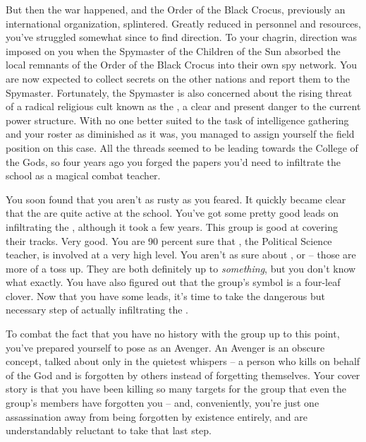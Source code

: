 \documentclass[char]{GL2020}
\begin{document}
But then the war happened, and the Order of the Black Crocus, previously an international organization, splintered. Greatly reduced in personnel and resources, you've struggled somewhat since to find direction. To your chagrin, direction was imposed on you when the Spymaster of the Children of the Sun absorbed the local remnants of the Order of the Black Crocus into their own spy network. You are now expected to collect secrets on the other nations and report them to the Spymaster. Fortunately, the Spymaster is also concerned about the rising threat of a radical religious cult known as the \pGoaties{}, a clear and present danger to the current power structure. With no one better suited to the task of intelligence gathering and your roster as diminished as it was, you managed to assign yourself the field position on this case. All the threads seemed to be leading towards the College of the Gods, so four years ago you forged the papers you'd need to infiltrate the school as a magical combat teacher.

You soon found that you aren't as rusty as you feared. It quickly became clear that the \pGoaties{} are quite active at the school. You've got some pretty good leads on infiltrating the \pGoaties{}, although it took a few years. This group is good at covering their tracks. Very good. You are 90 percent sure that \cChupInventor{\full}, the Political Science teacher, is involved at a very high level. You aren't as sure about \cChupSecond{\full}, or \cWildCard{\full} -- those are more of a toss up. They are both definitely up to \emph{something}, but you don't know what exactly. You have also figured out that the group's symbol is a four-leaf clover. Now that you have some leads, it's time to take the dangerous but necessary step of actually infiltrating the \pGoaties{}.

To combat the fact that you have no history with the group up to this point, you've prepared yourself to pose as an Avenger. An Avenger is an obscure concept, talked about only in the quietest whispers -- a person who kills on behalf of the God \cGenesis{} and is forgotten by others instead of forgetting themselves. Your cover story is that you have been killing so many targets for the group that even the group's members have forgotten you -- and, conveniently, you're just one assassination away from being forgotten by existence entirely, and are understandably reluctant to take that last step.
\end{document}
